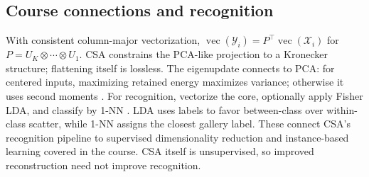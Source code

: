 \subsection{Course connections and recognition}
With consistent column-major vectorization,
$\operatorname{vec}(\mathcal Y_i)=P^\top\operatorname{vec}(\mathcal X_i)$ for
$P=U_K\otimes\cdots\otimes U_1$.
CSA constrains the PCA-like projection to a Kronecker structure; flattening
itself is lossless. The eigenupdate connects to PCA: for centered inputs,
maximizing retained energy maximizes variance; otherwise it uses second moments
\citep[Sec.~III-B]{xu2008csa}. For recognition, vectorize the core, optionally apply Fisher
LDA, and classify by 1-NN \citep[Sec.~IV-C]{xu2008csa}.
LDA uses labels to favor between-class over within-class scatter,
while 1-NN assigns the closest gallery label. These connect CSA's recognition
pipeline to supervised dimensionality reduction and instance-based learning
covered in the course.
CSA itself is unsupervised, so improved reconstruction need not improve recognition.
